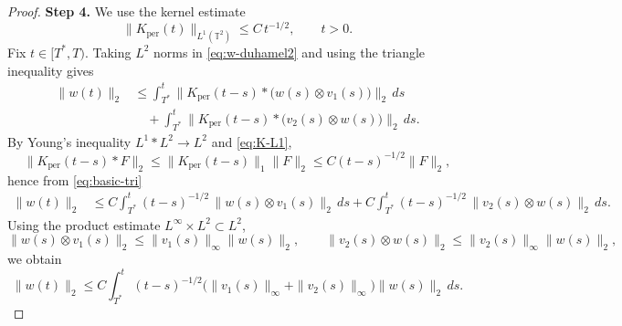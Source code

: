 \documentclass[10pt,a4paper]{amsart}
\begin{document}
\begin{proof}
\textbf{Step 4.}
We use the kernel estimate
\begin{equation}\label{eq:K-L1}
\|K_{\mathrm{per}}(t)\|_{L^1(\mathbb T^2)}\le C\,t^{-1/2},\qquad t>0.
\end{equation}
Fix $t\in[T^*,T)$. Taking $L^2$ norms in \eqref{eq:w-duhamel2} and using the triangle inequality gives
\begin{align}
\|w(t)\|_{2}
&\le \int_{T^*}^{t}\bigl\|K_{\mathrm{per}}(t-s)*\bigl(w(s)\otimes v_1(s)\bigr)\bigr\|_{2}\,ds
\nonumber\\
&\quad +\int_{T^*}^{t}\bigl\|K_{\mathrm{per}}(t-s)*\bigl(v_2(s)\otimes w(s)\bigr)\bigr\|_{2}\,ds.
\label{eq:basic-tri}
\end{align}
By Young's inequality $L^1*L^2\to L^2$ and \eqref{eq:K-L1},
\[
\|K_{\mathrm{per}}(t-s)*F\|_2\le \|K_{\mathrm{per}}(t-s)\|_1\|F\|_2\le C(t-s)^{-1/2}\|F\|_2,
\]
hence from \eqref{eq:basic-tri}
\begin{align}
\|w(t)\|_2
&\le C\int_{T^*}^{t}(t-s)^{-1/2}\,\|w(s)\otimes v_1(s)\|_2\,ds
+ C\int_{T^*}^{t}(t-s)^{-1/2}\,\|v_2(s)\otimes w(s)\|_2\,ds.
\label{eq:after-young}
\end{align}
Using the product estimate $L^\infty\times L^2\subset L^2$,
\[
\|w(s)\otimes v_1(s)\|_2\le \|v_1(s)\|_\infty\|w(s)\|_2,\qquad
\|v_2(s)\otimes w(s)\|_2\le \|v_2(s)\|_\infty\|w(s)\|_2,
\]
we obtain
\begin{equation}\label{eq:Volterra}
\|w(t)\|_2\le C\int_{T^*}^{t}(t-s)^{-1/2}\bigl(\|v_1(s)\|_\infty+\|v_2(s)\|_\infty\bigr)\|w(s)\|_2\,ds.
\end{equation}


\end{proof}
\end{document}
